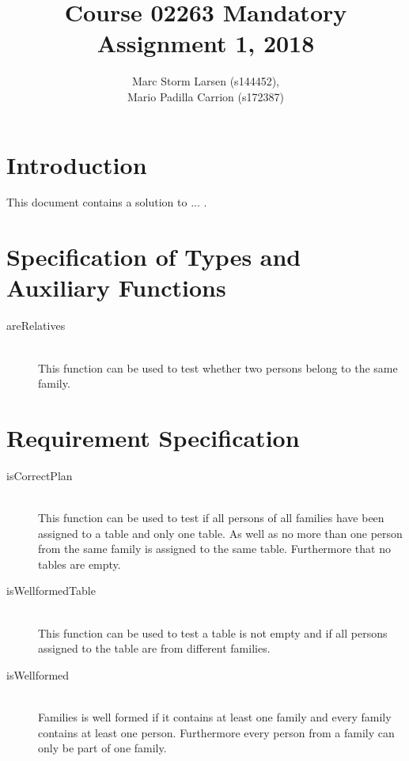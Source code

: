 \documentclass[a4]{article}
\title{Course 02263 Mandatory Assignment 1, 2018}
\author{Marc Storm Larsen (s144452),\\ 
        Mario Padilla Carrion (s172387)}
\begin{document}
\maketitle

\tableofcontents
\newpage

\section{Introduction}
This document contains a solution to ... . 

\section{Specification of Types and Auxiliary Functions}


  

\begin{description}
  \item[areRelatives] \hfill \\ This function can be used to test whether two persons belong to the same family.
\end{description}

\section{Requirement Specification}

  

\begin{description}
  \item[isCorrectPlan] \hfill \\ This function can be used to test if all persons of all families have been assigned to a table and only one table. As well as no more than one person from the same family is assigned to the same table. Furthermore that no tables are empty.
  \item[isWellformedTable] \hfill \\ This function can be used to test a table is not empty and if all persons assigned to the table are from different families.
  \item[isWellformed] \hfill \\ Families is well formed if it contains at least one family and every family contains at least one person. Furthermore every person from a family can only be part of one family.
\end{description}
\end{document}
